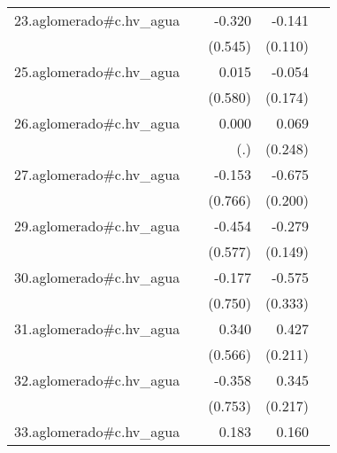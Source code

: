 {\begin{longtable}{l*{4}{D{.}{.}{-1}}}
\addlinespace
23.aglomerado#c.hv\_agua&                     &      -0.320         &      -0.141         &                     \\
            &                     &     (0.545)         &     (0.110)         &                     \\
\addlinespace
25.aglomerado#c.hv\_agua&                     &       0.015         &      -0.054         &                     \\
            &                     &     (0.580)         &     (0.174)         &                     \\
\addlinespace
26.aglomerado#c.hv\_agua&                     &       0.000         &       0.069         &                     \\
            &                     &         (.)         &     (0.248)         &                     \\
\addlinespace
27.aglomerado#c.hv\_agua&                     &      -0.153         &      -0.675\sym{***}&                     \\
            &                     &     (0.766)         &     (0.200)         &                     \\
\addlinespace
29.aglomerado#c.hv\_agua&                     &      -0.454         &      -0.279         &                     \\
            &                     &     (0.577)         &     (0.149)         &                     \\
\addlinespace
30.aglomerado#c.hv\_agua&                     &      -0.177         &      -0.575         &                     \\
            &                     &     (0.750)         &     (0.333)         &                     \\
\addlinespace
31.aglomerado#c.hv\_agua&                     &       0.340         &       0.427\sym{*}  &                     \\
            &                     &     (0.566)         &     (0.211)         &                     \\
\addlinespace
32.aglomerado#c.hv\_agua&                     &      -0.358         &       0.345         &                     \\
            &                     &     (0.753)         &     (0.217)         &                     \\
\addlinespace
33.aglomerado#c.hv\_agua&                     &       0.183         &       0.160\sym{*}  &                     \\

\end{longtable}}
